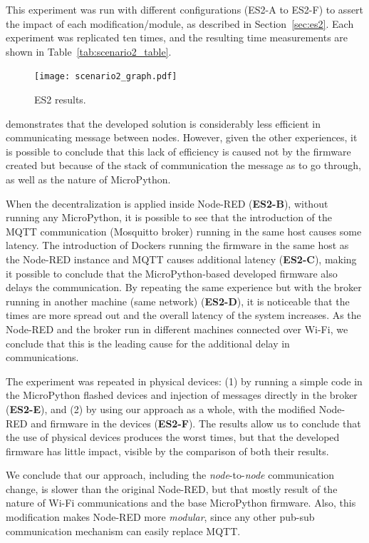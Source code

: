 This experiment was run with different configurations (ES2-A to ES2-F) to assert the impact of each modification/module, as described in Section~\ref{sec:es2}. Each experiment was replicated ten times, and the resulting time measurements are shown in Table~\ref{tab:scenario2_table}.

\begin{figure}[h]
\centering
\texttt{[image: scenario2\_graph.pdf]}
\caption[ES2 results.]{ES2 results.}\label{fig:scenario2_candlestick}
\end{figure}

 demonstrates that the developed solution is considerably less efficient in communicating message between nodes. However, given the other experiences, it is possible to conclude that this lack of efficiency is caused not by the firmware created but because of the stack of communication the message as to go through, as well as the nature of MicroPython. 

When the decentralization is applied inside Node-RED (\cf \textbf{ES2-B}), without running any MicroPython, it is possible to see that the introduction of the MQTT communication (Mosquitto broker) running in the same host causes some latency. The introduction of Dockers running the firmware in the same host as the Node-RED instance and MQTT causes additional latency (\cf \textbf{ES2-C}), making it possible to conclude that the MicroPython-based developed firmware also delays the communication. By repeating the same experience but with the broker running in another machine (same network) (\cf \textbf{ES2-D}), it is noticeable that the times are more spread out and the overall latency of the system increases. As the Node-RED and the broker run in different machines connected over Wi-Fi, we conclude that this is the leading cause for the additional delay in communications.

The experiment was repeated in physical devices: (1) by running a simple code in the MicroPython flashed devices and injection of messages directly in the broker (\cf \textbf{ES2-E}), and (2) by using our approach as a whole, with the modified Node-RED and firmware in the devices (\cf \textbf{ES2-F}). The results allow us to conclude that the use of physical devices produces the worst times, but that the developed firmware has little impact, visible by the comparison of both their results.

We conclude that our approach, including the \textit{node}-to-\textit{node} communication change, is slower than the original Node-RED, but that mostly result of the nature of Wi-Fi communications and the base MicroPython firmware. Also, this modification makes Node-RED more \textit{modular}, since any other pub-sub communication mechanism can easily replace MQTT.

